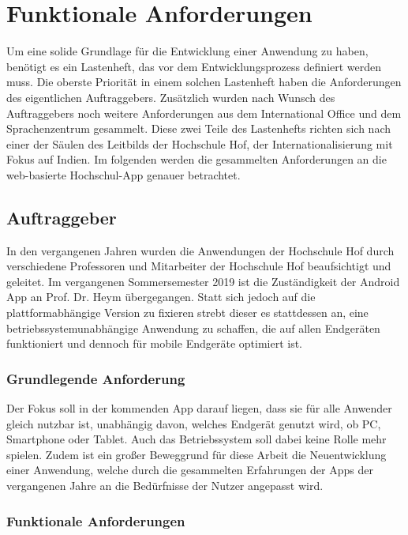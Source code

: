 \chapter{Funktionale Anforderungen}
\label{sec:anforderung}

Um eine solide Grundlage für die Entwicklung einer Anwendung zu haben, benötigt es ein Lastenheft, das vor dem Entwicklungsprozess definiert werden muss. Die oberste Priorität in einem solchen Lastenheft haben die Anforderungen des eigentlichen Auftraggebers. Zusätzlich wurden nach Wunsch des Auftraggebers noch weitere Anforderungen aus dem International Office und dem Sprachenzentrum gesammelt. Diese zwei Teile des Lastenhefts richten sich nach einer der Säulen des Leitbilds der Hochschule Hof, der Internationalisierung mit Fokus auf Indien. Im folgenden werden die gesammelten Anforderungen an die web-basierte Hochschul-\ac{App} genauer betrachtet.

\section{Auftraggeber\label{sec:anforderungen_ag}}

In den vergangenen Jahren wurden die Anwendungen der Hochschule Hof durch verschiedene Professoren und Mitarbeiter der Hochschule Hof beaufsichtigt und geleitet. Im vergangenen Sommersemester 2019 ist die Zuständigkeit der Android \ac{App} an Prof. Dr. Heym übergegangen. Statt sich jedoch auf die plattformabhängige Version zu fixieren strebt dieser es stattdessen an, eine betriebssystemunabhängige Anwendung zu schaffen, die auf allen Endgeräten funktioniert und dennoch für mobile Endgeräte optimiert ist.

\subsection{Grundlegende Anforderung}

Der Fokus soll in der kommenden \ac{App} darauf liegen, dass sie für alle Anwender gleich nutzbar ist, unabhängig davon, welches Endgerät genutzt wird, ob \ac{PC}, Smartphone oder Tablet. Auch das Betriebssystem soll dabei keine Rolle mehr spielen. Zudem ist ein großer Beweggrund für diese Arbeit die Neuentwicklung einer Anwendung, welche durch die gesammelten Erfahrungen der \acp{App} der vergangenen Jahre an die Bedürfnisse der Nutzer angepasst wird.  

\subsection{Funktionale Anforderungen}

